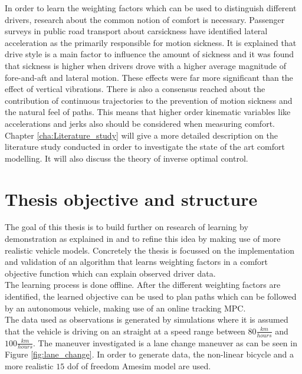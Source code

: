In order to learn the weighting factors which can be used to distinguish different drivers, research about the common notion of comfort is necessary. Passenger surveys in public road transport about carsickness \cite{Turner1999} have identified lateral acceleration as the primarily responsible for motion sickness. It is explained that drive style is a main factor to influence the amount of sickness and it was found that sickness is higher when drivers drove with a higher average magnitude of fore-and-aft and lateral motion. These effects were far more significant than the effect of vertical vibrations. There is also a consensus reached about the contribution of continuous trajectories to the prevention of motion sickness and the natural feel of paths.\cite{Elbanhawi2015} This means that higher order kinematic variables like accelerations and jerks also should be considered when measuring comfort. Chapter \ref{cha:Literature_study} will give a more detailed description on the literature study conducted in order to investigate the state of the art comfort modelling. It will also discuss the theory of inverse optimal control.\\

\section{Thesis objective and structure}
The goal of this thesis is to build further on research of learning by demonstration as explained in \cite{Kuderer2015a} and to refine this idea by making use of more realistic vehicle models. Concretely the thesis is focussed on the implementation and validation of an algorithm that learns weighting factors in a comfort objective function which can explain observed driver data.\\
The learning process is done offline. After the different weighting factors are identified, the learned objective can be used to plan paths which can be followed by an autonomous vehicle, making use of an online tracking MPC.\\

The data used as observations is generated by simulations where it is assumed that the vehicle is driving on an straight at a speed range between $80\frac{km}{hours}$ and $100\frac{km}{hours}$. The maneuver investigated is a lane change maneuver as can be seen in Figure \ref{fig:lane_change}. In order to generate data, the non-linear bicycle and a more realistic $15$ dof of freedom Amesim model are used.\\

